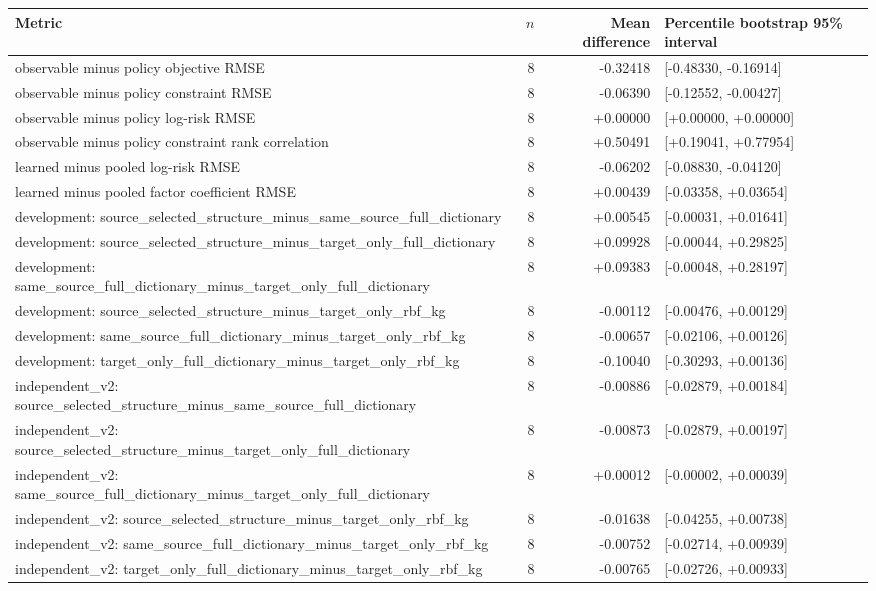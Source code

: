 \begin{tabular}{p{}r r l}
\toprule
Metric & $n$ & Mean difference & Percentile bootstrap 95\% interval\\
\midrule
observable minus policy objective RMSE & 8 & -0.32418 & [-0.48330, -0.16914] \\
observable minus policy constraint RMSE & 8 & -0.06390 & [-0.12552, -0.00427] \\
observable minus policy log-risk RMSE & 8 & +0.00000 & [+0.00000, +0.00000] \\
observable minus policy constraint rank correlation & 8 & +0.50491 & [+0.19041, +0.77954] \\
learned minus pooled log-risk RMSE & 8 & -0.06202 & [-0.08830, -0.04120] \\
learned minus pooled factor coefficient RMSE & 8 & +0.00439 & [-0.03358, +0.03654] \\
development: source\_selected\_structure\_minus\_same\_source\_full\_dictionary & 8 & +0.00545 & [-0.00031, +0.01641] \\
development: source\_selected\_structure\_minus\_target\_only\_full\_dictionary & 8 & +0.09928 & [-0.00044, +0.29825] \\
development: same\_source\_full\_dictionary\_minus\_target\_only\_full\_dictionary & 8 & +0.09383 & [-0.00048, +0.28197] \\
development: source\_selected\_structure\_minus\_target\_only\_rbf\_kg & 8 & -0.00112 & [-0.00476, +0.00129] \\
development: same\_source\_full\_dictionary\_minus\_target\_only\_rbf\_kg & 8 & -0.00657 & [-0.02106, +0.00126] \\
development: target\_only\_full\_dictionary\_minus\_target\_only\_rbf\_kg & 8 & -0.10040 & [-0.30293, +0.00136] \\
independent\_v2: source\_selected\_structure\_minus\_same\_source\_full\_dictionary & 8 & -0.00886 & [-0.02879, +0.00184] \\
independent\_v2: source\_selected\_structure\_minus\_target\_only\_full\_dictionary & 8 & -0.00873 & [-0.02879, +0.00197] \\
independent\_v2: same\_source\_full\_dictionary\_minus\_target\_only\_full\_dictionary & 8 & +0.00012 & [-0.00002, +0.00039] \\
independent\_v2: source\_selected\_structure\_minus\_target\_only\_rbf\_kg & 8 & -0.01638 & [-0.04255, +0.00738] \\
independent\_v2: same\_source\_full\_dictionary\_minus\_target\_only\_rbf\_kg & 8 & -0.00752 & [-0.02714, +0.00939] \\
independent\_v2: target\_only\_full\_dictionary\_minus\_target\_only\_rbf\_kg & 8 & -0.00765 & [-0.02726, +0.00933] \\
\bottomrule
\end{tabular}
